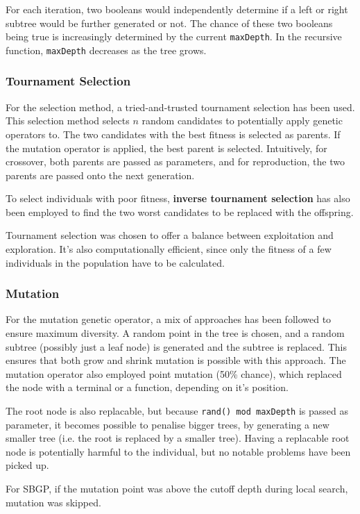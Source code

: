 \documentclass{article}
\begin{document}
For each iteration, two booleans would independently determine if a left or right subtree would be further generated or not. The chance of these two booleans being true is increasingly determined by the current \texttt{maxDepth}. In the recursive function, \texttt{maxDepth} decreases as the tree grows.

\subsubsection{Tournament Selection}
\label{selection}
For the selection method, a tried-and-trusted tournament selection has been used. This selection method selects \(n\) random candidates to potentially apply genetic operators to. The two candidates with the best fitness is selected as parents. If the mutation operator is applied, the best parent is selected. Intuitively, for crossover, both parents are passed as parameters, and for reproduction, the two parents are passed onto the next generation.

To select individuals with poor fitness, \textbf{inverse tournament selection} has also been employed to find the two worst candidates to be replaced with the offspring.

Tournament selection was chosen to offer a balance between exploitation and exploration. It's also computationally efficient, since only the fitness of a few individuals in the population have to be calculated.

\subsubsection{Mutation}
For the mutation genetic operator, a mix of approaches has been followed to ensure maximum diversity. A random point in the tree is chosen, and a random subtree (possibly just a leaf node) is generated and the subtree is replaced. This ensures that both grow and shrink mutation is possible with this approach. The mutation operator also employed point mutation (50\% chance), which replaced the node with a terminal or a function, depending on it's position.

The root node is also replacable, but because \texttt{rand() mod maxDepth} is passed as parameter, it becomes possible to penalise bigger trees, by generating a new smaller tree (i.e. the root is replaced by a smaller tree). Having a replacable root node is potentially harmful to the individual, but no notable problems have been picked up.

For SBGP, if the mutation point was above the cutoff depth during local search, mutation was skipped.
\end{document}
